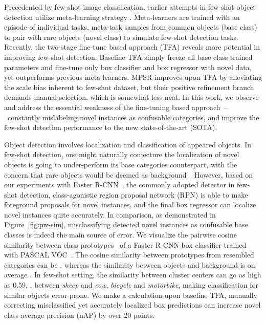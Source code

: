 \documentclass[final]{cvpr}
\begin{document}
Precedented by few-shot image classification, earlier attempts in few-shot object detection utilize meta-learning strategy \cite{yan_meta_2020,wang_meta-learning_2019,xiao_few_shot_2020}. Meta-learners are trained with an episode of individual tasks, meta-task samples from common objects (base class) to pair with rare objects (novel class) to simulate few-shot detection tasks. Recently, the two-stage fine-tune based approach (TFA) reveals more potential in improving few-shot detection. Baseline TFA \cite{wang_frustratingly_2020} simply freeze all base class trained parameters and fine-tune only box classifier and box regressor with novel data, yet outperforms previous meta-learners. MPSR \cite{wu_multi-scale_2020} improves upon TFA by alleviating the scale bias inherent to few-shot dataset, but their positive refinement branch demands manual selection, which is somewhat less neat. In this work, we observe and address the essential weakness of the fine-tuning based approach~--~constantly mislabeling novel instances as confusable categories, and improve the few-shot detection performance to the new state-of-the-art (SOTA).

Object detection involves localization and classification of appeared objects. In few-shot detection, one might naturally conjecture the localization of novel objects is going to under-perform its base categories counterpart, with the concern that rare objects would be deemed as background~\cite{wang_meta-learning_2019,yan_meta_2020,fan2020few}. However, based on our experiments with Faster R-CNN~\cite{ren_faster_2016}, the commonly adopted detector in few-shot detection, class-agonistic region proposal network (RPN) is able to make foreground proposals for novel instances, and the final box regressor can localize novel instances quite accurately. In comparison, as demonstrated in Figure~\ref{fig:pw-sim}, misclassifying detected novel instances as confusable base classes is indeed the main source of error. We visualize the pairwise cosine similarity between class prototypes~\cite{snell_prototypical_2017,cos_face,deng_arcface_2019} of a Faster R-CNN box classifier trained with PASCAL VOC~\cite{voc07,voc12}. The cosine similarity between prototypes from resembled categories can be , whereas the similarity between objects and background is on average . In few-shot setting, the similarity between cluster centers can go as high as 0.59, \eg, between \textit{sheep} and \textit{cow}, \textit{bicycle} and \textit{motorbike}, making classification for similar objects error-prone.  We make a calculation upon baseline TFA, manually correcting misclassified yet accurately localized box predictions can increase novel class average precision (nAP) by over 20 points.
\end{document}
